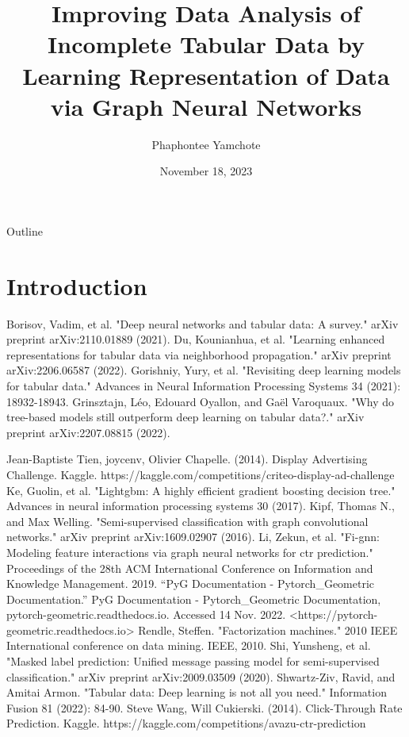 \documentclass[aspectratio=169]{beamer}
\title[]{Improving Data Analysis of Incomplete Tabular Data by Learning Representation of Data via Graph Neural Networks}
\institute[]{Faculty of ICT, Mahidol University}
\author{Phaphontee Yamchote}
\date{November 18, 2023}
\theoremstyle{definition}
\begin{document}
	
	\addtocounter{framenumber}{-1}
	{
		\frame{\titlepage}
	}
	
	\begin{frame}{Outline}
		\tableofcontents
	\end{frame}
	
	\section{Introduction}
	

	\begin{frame}{\bibname}
	\tiny \begin{thebibliography}{99} %
			 Borisov, Vadim, et al. "Deep neural networks and tabular data: A survey." arXiv preprint arXiv:2110.01889 (2021).
			 Du, Kounianhua, et al. "Learning enhanced representations for tabular data via neighborhood propagation." arXiv preprint arXiv:2206.06587 (2022).
			 Gorishniy, Yury, et al. "Revisiting deep learning models for tabular data." Advances in Neural Information Processing Systems 34 (2021): 18932-18943.
			 Grinsztajn, Léo, Edouard Oyallon, and Gaël Varoquaux. "Why do tree-based models still outperform deep learning on tabular data?." arXiv preprint arXiv:2207.08815 (2022).

			 Jean-Baptiste Tien, joycenv, Olivier Chapelle. (2014). Display Advertising Challenge. Kaggle. https://kaggle.com/competitions/criteo-display-ad-challenge
			 Ke, Guolin, et al. "Lightgbm: A highly efficient gradient boosting decision tree." Advances in neural information processing systems 30 (2017).
			 Kipf, Thomas N., and Max Welling. "Semi-supervised classification with graph convolutional networks." arXiv preprint arXiv:1609.02907 (2016).
			 Li, Zekun, et al. "Fi-gnn: Modeling feature interactions via graph neural networks for ctr prediction." Proceedings of the 28th ACM International Conference on Information and Knowledge Management. 2019.
			 “PyG Documentation - Pytorch\_Geometric Documentation.” PyG Documentation - Pytorch\_Geometric Documentation, pytorch-geometric.readthedocs.io. Accessed 14 Nov. 2022. <https://pytorch-geometric.readthedocs.io>
			 Rendle, Steffen. "Factorization machines." 2010 IEEE International conference on data mining. IEEE, 2010.
			 Shi, Yunsheng, et al. "Masked label prediction: Unified message passing model for semi-supervised classification." arXiv preprint arXiv:2009.03509 (2020).
			 Shwartz-Ziv, Ravid, and Amitai Armon. "Tabular data: Deep learning is not all you need." Information Fusion 81 (2022): 84-90.
			 Steve Wang, Will Cukierski. (2014). Click-Through Rate Prediction. Kaggle. https://kaggle.com/competitions/avazu-ctr-prediction
		\end{thebibliography}
	\end{frame}
	
\end{document}

